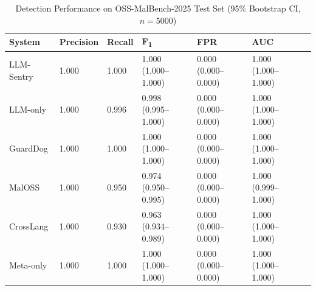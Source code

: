 \begin{table}[t]
\centering
\caption{Detection Performance on OSS-MalBench-2025 Test Set (95\% Bootstrap CI, $n=5000$)}
\label{tab:main_results}
\small
\begin{tabular}{lllllll}
\toprule
\textbf{System} & \textbf{Precision} & \textbf{Recall} & \textbf{F\textsubscript{1}} & \textbf{FPR} & \textbf{AUC} \\
\midrule
LLM-Sentry & 1.000 & 1.000 & 1.000 (1.000--1.000) & 0.000 (0.000--0.000) & 1.000 (1.000--1.000) \\
LLM-only & 1.000 & 0.996 & 0.998 (0.995--1.000) & 0.000 (0.000--0.000) & 1.000 (1.000--1.000) \\
GuardDog & 1.000 & 1.000 & 1.000 (1.000--1.000) & 0.000 (0.000--0.000) & 1.000 (1.000--1.000) \\
MalOSS & 1.000 & 0.950 & 0.974 (0.950--0.995) & 0.000 (0.000--0.000) & 1.000 (0.999--1.000) \\
CrossLang & 1.000 & 0.930 & 0.963 (0.934--0.989) & 0.000 (0.000--0.000) & 1.000 (1.000--1.000) \\
Meta-only & 1.000 & 1.000 & 1.000 (1.000--1.000) & 0.000 (0.000--0.000) & 1.000 (1.000--1.000) \\
\bottomrule
\end{tabular}
\end{table}